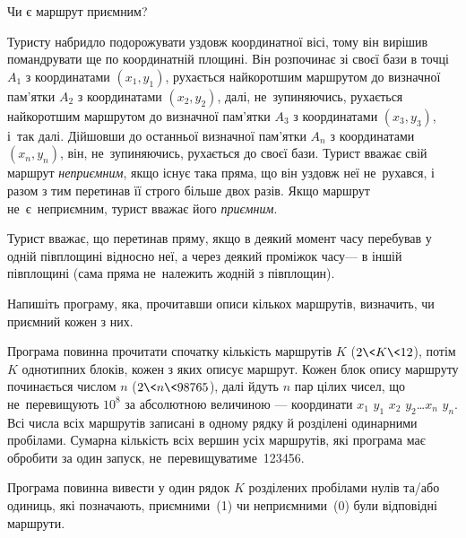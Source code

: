 ﻿\begin{problemAllDefault}{Чи є маршрут приємним?}

Туристу набридло подорожувати уздовж координатної вісі, тому він вирішив помандрувати ще по координатній площині. Він розпочинає зі своєї бази в точці $A_1$ з координатами $(x_1,y_1)$, рухається найкоротшим маршрутом до визначної пам'ятки $A_2$ з координатами $(x_2,y_2)$, далі, не~зупиняючись, рухається найкоротшим маршрутом до визначної пам’ятки $A_3$ з координатами $(x_3,y_3)$, і~так далі. Дійшовши до останньої визначної пам’ятки $A_n$ з координатами $(x_n,y_n)$, він, не~зупиняючись, рухається до своєї бази. Турист вважає свій маршрут \emph{непри\-єм\-ним}, якщо існує така пряма, що він уздовж неї не~рухався, і разом з тим перетинав її строго більше двох разів. Якщо маршрут не~є~неприємним, турист вважає його \emph{приємним}. 

Турист вважає, що перетинав пряму, якщо в деякий момент часу перебував у одній півплощині відносно неї, а через деякий проміжок часу\nolinebreak[3] --- в іншій півплощині (сама пряма не~належить жодній з півплощин).

Напишіть програму, яка, прочитавши описи кількох маршрутів, визначить, чи приємний кожен з них.

\InputFile
Програма повинна прочитати спочатку кількість маршрутів $K$ ($2{\<}K{\<}12$), потім $K$ однотипних блоків, кожен з яких описує маршрут. Кожен блок опису маршруту починається числом $n$ ($2{\<}n{\<}98765$), далі йдуть $n$ пар цілих чисел, що не~перевищують $10^8$ за абсолютною величиною — координати $x_1$ $y_1$ $x_2$ $y_2$\dots $x_n$ $y_n$. Всі числа всіх маршрутів записані в одному рядку й розділені одинарними пробілами. Сумарна кількість всіх вершин усіх маршрутів, які програма має обробити за один запуск, не~перевищуватиме~123456.

\OutputFile
Програма повинна вивести у один рядок $K$ розділених пробілами нулів та/або одиниць, які позначають, приємними~(1) чи неприємними~(0) були відповідні маршрути.

\Example

\noindent
\begin{exampleSimple}{23em}{7em}
%
\end{exampleSimple}


\vspace{-2\baselineskip}


\end{problemAllDefault}
